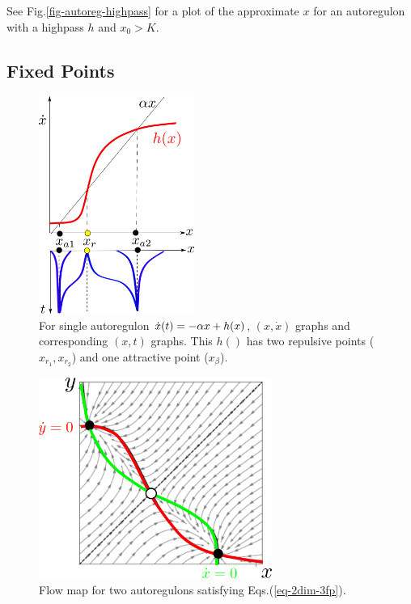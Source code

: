 See Fig.\ref{fig-autoreg-highpass}
for a plot of the approximate 
$x$ for an autoregulon with a highpass $h$
and $x_0>K$.








\subsection{Fixed Points}

\begin{figure}[h!]
\centering
\includegraphics[width=2in]
{autoregulons/source-sink-source.png}
\caption{For single autoregulon $\dot{x}(t)=-\alpha x + h(x)$, $(x, \dot{x})$ graphs and 
corresponding $(x,t)$ graphs. This $h()$ has
two repulsive  points ($x_{r_1}, x_{r_2}$) 
and one attractive  point ($x_\beta$).
}
\label{fig-source-sink-source}
\end{figure}

\begin{figure}[h!]
\centering
\includegraphics[width=3in]
{autoregulons/2dim-3fp.png}
\caption{Flow map for two autoregulons satisfying Eqs.(\ref{eq-2dim-3fp}).}
\label{fig-2dim-3fp}
\end{figure}

